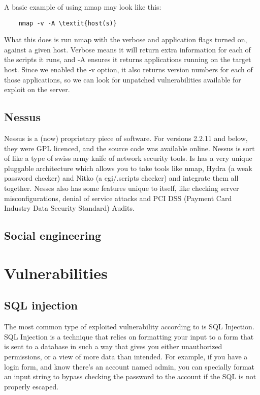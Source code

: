 \documentclass[12pt]{article}
\begin{document}
A basic example of using nmap may look like this:

\begin{verbatim}
    nmap -v -A \textit{host(s)}
\end{verbatim}

What this does is run nmap with the verbose and application flags turned on,
against a given host. Verbose means it will return extra information for each 
of the scripts it runs, and -A ensures it returns applications running on the
target host. Since we enabled the -v option, it also returns version numbers
for each of those applications, so we can look for unpatched vulnerabilities
available for exploit on the server.

\subsection{Nessus}

Nessus is a (now) proprietary piece of software. For versions 2.2.11 and below,
they were GPL licenced, and the source code was available online. Nessus is
sort of like a type of swiss army knife of network security tools. Is has
a very unique pluggable architecture which allows you to take tools like
nmap, Hydra (a weak password checker) and Nitko (a cgi/.scripts checker) and
integrate them all together. Nesses also has some features unique to itself,
like checking server misconfigurations, denial of service attacks and
PCI DSS (Payment Card Industry Data Security Standard) Audits.

\subsection{Social engineering}

\section{Vulnerabilities}

\subsection{SQL injection}

The most common type of exploited vulnerability according to
\cite{mostcommonvulnerability} is SQL Injection. SQL Injection is a technique
that relies on formatting your input to a form that is sent to a database in
such a way that gives you either unauthorized permissions, or a view of more
data than intended. For example, if you have a login form, and know there's
an account named admin, you can specially format an input string to bypass
checking the password to the account if the SQL is not properly escaped.
\end{document}
